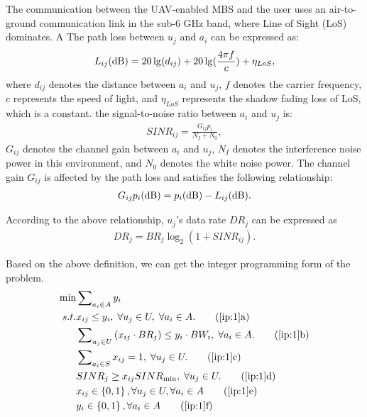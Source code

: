 \documentclass[11pt,a4paper]{article}
\begin{document}
The communication between the UAV-enabled MBS and the user uses an air-to-ground communication link in the sub-6 GHz band, where Line of Sight (LoS) dominates. A The path loss between $u_j$ and $a_i$ can be expressed as:
\begin{eqnarray}
	{L_{ij}}({\rm{dB}}) = 20\lg ({d_{ij}}) + 20\lg (\frac{{4\pi f}}{c}) + {\eta _{LoS}},
\end{eqnarray}
where $d_{ij}$ denotes the distance between $a_i$ and $u_j$, $f$ denotes the carrier frequency, $c$ represents the speed of light, and $\eta _{LoS}$ represents the shadow fading loss of LoS, which is a constant. the signal-to-noise ratio between $a_i$ and $u_j$ is:
\begin{eqnarray}
	SINR_{ij} = \frac{{{G_{ij}}{p_i}}}{{{N_I} + {N_0}}},
\end{eqnarray}
$G_{ij}$ denotes the channel gain between $a_i$ and $u_j$, $N_I$ denotes the interference noise power in this environment, and $N_0$ denotes the white noise power. The channel gain $G_{ij}$ is affected by the path loss and satisfies the following relationship:
\begin{eqnarray}
	{G_{ij}}{p_i}({\rm{dB}}) = {p_i}({\rm{dB}}) - {L_{ij}}({\rm{dB}}).
\end{eqnarray}


According to the above relationship, $u_j$'s data rate $DR_j$ can be expressed as
\begin{eqnarray}
	D{R_j} = B{R_j}{\log _2}(1 + SIN{R_{ij}}).
\end{eqnarray}


%
Based on the above definition, we can get the integer programming form of the problem.
\begin{align}
	\min  & \sum\nolimits_{{a_i} \in A} {{y_i}}  \label{ip:1}\\
	s.t. &  {x_{ij}} \le {y_i},\;\forall {u_j} \in U,\;\forall {a_i} \in A. \tag{\ref{ip:1}{a}}\label{ip:1.1}\\
	&  \sum\nolimits_{{u_j} \in U} {({x_{ij}} \cdot B{R_j})}  \le {y_i} \cdot B{W_i},\;\forall {a_i} \in A. \tag{\ref{ip:1}{b}}\label{ip:1.2}\\
	&  \sum\nolimits_{{a_i} \in S} {{x_{ij}}}  = 1,\;\forall {u_j} \in U. \tag{\ref{ip:1}{c}}\label{ip:1.3}\\
	&  SIN{R_j} \ge {x_{ij}}SIN{R_{\min }},\;\forall {u_j} \in U. \tag{\ref{ip:1}{d}}\label{ip:1.4}\\
	&  {x_{ij}} \in \left\{ {0,1} \right\},\forall u_j \in U,\forall {a_i} \in A \tag{\ref{ip:1}{e}}\label{ip:1.5}\\
	&  {y_{i}} \in \left\{ {0,1} \right\},\forall {a_i} \in A \tag{\ref{ip:1}{f}}\label{ip:1.6}
\end{align}
\end{document}
